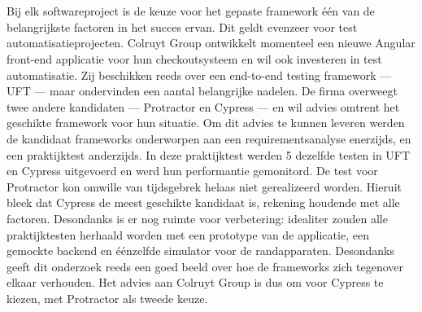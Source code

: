 
%
%



\chapter*{}

Bij elk softwareproject is de keuze voor het gepaste framework één van de belangrijkste factoren in het succes ervan. Dit geldt evenzeer voor test automatisatieprojecten. Colruyt Group ontwikkelt momenteel een nieuwe Angular front-end applicatie voor hun checkoutsysteem en wil ook investeren in test automatisatie. Zij beschikken reeds over een end-to-end testing framework — UFT — maar ondervinden een aantal belangrijke nadelen. De firma overweegt twee andere kandidaten — Protractor en Cypress — en wil advies omtrent het geschikte framework voor hun situatie. Om dit advies te kunnen leveren werden de kandidaat frameworks onderworpen aan een requirementsanalyse enerzijds, en een praktijktest anderzijds. In deze praktijktest werden 5 dezelfde testen in UFT en Cypress uitgevoerd en werd hun performantie gemonitord. De test voor Protractor kon omwille van tijdsgebrek helaas niet gerealizeerd worden. Hieruit bleek dat Cypress de meest geschikte kandidaat is, rekening houdende met alle factoren. Desondanks is er nog ruimte voor verbetering: idealiter zouden alle praktijktesten herhaald worden met een prototype van de applicatie, een gemockte backend en éénzelfde simulator voor de randapparaten. Desondanks geeft dit onderzoek reeds een goed beeld over hoe de frameworks zich tegenover elkaar verhouden. Het advies aan Colruyt Group is dus om voor Cypress te kiezen, met Protractor als tweede keuze.
